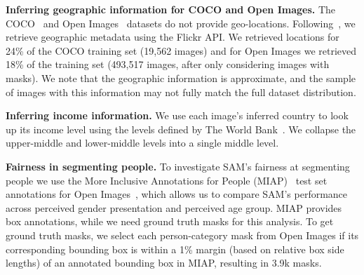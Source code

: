 \documentclass[10pt,twocolumn,letterpaper]{article}
\renewcommand{\paragraph}[1]{\vspace{1.25mm}\noindent\textbf{#1}}
\newcommand{\sam}{SAM\xspace}
\begin{document}
\paragraph{Inferring geographic information for COCO and Open Images.} The COCO~\cite{Lin2014} and Open Images~\cite{OpenImages} datasets do not provide geo-locations. Following~\cite{De2019}, we retrieve geographic metadata using the Flickr API. We retrieved locations for 24\% of the COCO training set (19,562 images) and for Open Images we retrieved 18\% of the training set (493,517 images, after only considering images with masks). We note that the geographic information is approximate, and the sample of images with this information may not fully match the full dataset distribution.

\paragraph{Inferring income information.} We use each image's inferred country to look up its income level using the levels defined by The World Bank~\cite{worldbank2022}. We collapse the upper-middle and lower-middle levels into a single middle level.

\paragraph{Fairness in segmenting people.} To investigate \sam's fairness at segmenting people we use the More Inclusive Annotations for People (MIAP)~\cite{schumann2021step} test set annotations for Open Images~\cite{OpenImages}, which allows us to compare \sam's performance across perceived gender presentation and perceived age group. MIAP provides box annotations, while we need ground truth masks for this analysis. To get ground truth masks, we select each person-category mask from Open Images if its corresponding bounding box is within a 1\% margin (based on relative box side lengths) of an annotated bounding box in MIAP, resulting in 3.9k masks.
\end{document}
